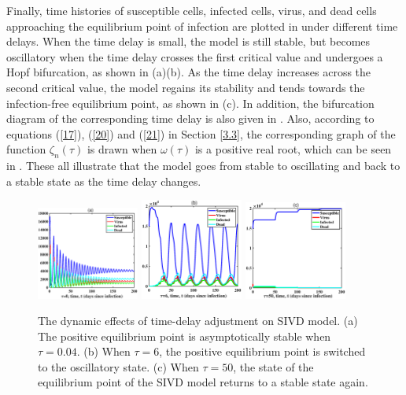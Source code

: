 \documentclass{CMHPhD-SIVD}
\begin{document}
Finally, time histories of susceptible cells, infected cells, virus, and dead cells approaching the equilibrium point of infection are plotted in  under different time delays. When the time delay is small, the model is still stable, but becomes oscillatory when the time delay crosses the first critical value and undergoes a Hopf bifurcation, as shown in (a)(b). As the time delay increases across the second critical value, the model regains its stability and tends towards the infection-free equilibrium point, as shown in (c). In addition, the bifurcation diagram of the corresponding time delay is also given in . Also, according to equations (\ref{17}), (\ref{20}) and (\ref{21}) in Section \ref{3.3}, the corresponding graph of the function $\zeta_n(\tau)$ is drawn when $\omega(\tau)$ is a positive real root, which can be seen in . These all illustrate that the model goes from stable to oscillating and back to a stable state as the time delay changes.
\begin{figure}[h!]
\centering
\includegraphics[height=0.16\textheight,width=0.3\textwidth]{I11.eps}
\includegraphics[height=0.16\textheight,width=0.3\textwidth]{I22.eps}
\includegraphics[height=0.16\textheight,width=0.3\textwidth]{I44.eps}
\vspace{3mm}
\caption{The dynamic effects of time-delay adjustment on SIVD model. (a) The positive equilibrium point is asymptotically stable when $\tau=0.04$. (b) When $\tau=6$, the positive equilibrium point is switched to the oscillatory state. (c) When $\tau=50$, the state of the equilibrium point of the SIVD model returns to a stable state again.}
\label{Fig.20}
\end{figure}
\end{document}
